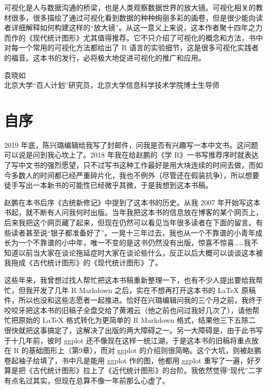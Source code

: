 \documentclass[
  b5paper,
  UTF8,twoside]{book}
\begin{document}
可视化是人与数据沟通的桥梁，也是人类观察数据世界的放大镜。可视化相关的教材很多，很多描绘了通过可视化看到数据的种种绚丽多彩的画卷，但是很少能向读者详细解释如何构建这样的``放大镜''。从这一意义上来说，这本作者聚十四年之力而作的《现代统计图形》尤其值得推荐。它不只介绍了可视化的概念和方法，书中对每一个常用的可视化方法都给出了 R 语言的实验细节，这是很多可视化实践者的福音。这本书的发行，必将极大地促进可视化的推广和应用。

\begin{flushright}
袁晓如\\
北京大学``百人计划''研究员，北京大学信息科学技术学院博士生导师
\end{flushright}

\chapter*{自序}\label{preface}

2019 年底，陈兴璐编辑给我写了封邮件，问我是否有兴趣写一本中文书。这问题可以说是问到我心坎上了。2018 年我在给赵鹏的《学 R》一书写推荐序时就表达了写中文书的强烈愿望，只不过写书这种工作最好是用大块连续的时间去做，而如今多数人的时间都已经严重碎片化，我也不例外（尽管还在假装抗争），所以想要徒手写出一本新书的可能性已经微乎其微，于是我想到这本书稿。

赵鹏在本书后序《古统新修记》中提到了这本书的历史。从我 2007 年开始写这本书起，就不断有人问我何时出版。当年我把这本书的信息放在博客的某个网页上，后来我把这个网页藏了起来，但现在仍然可以看见当年很多读者在下面的留言。有些读者甚至说``银子都准备好了''。一晃十三年过去，我也从一个不靠谱的小青年成长为一个不靠谱的小中年，唯一不变的是这书仍然没有出版，惊喜不惊喜\ldots\ldots 我不知道以前当大家在谈论拖延症时大家在谈论些什么，反正以后大概可以谈谈这本被我拖成《古代统计图形》的《现代统计图形》了。

这些年来，我曾想过找人帮忙把这本书稿重新整理一下，也有不少人提出要给我帮忙，但我开发了几年 R Markdown 之后，实在不想再打开这本书的 LaTeX 原稿件，所以也没和这些志愿者一起推进。恰好在兴璐编辑问我的三个月之前，我终于咬咬牙把这本书的旧稿子全盘交给了黄湘云（他之前也问过我好几次了），请他帮忙把原始的 LaTeX 格式转化为更简单的 R Markdown 格式，结果他三下五除二很快就把这事搞定了，这解决了出版的两大障碍之一。另一大障碍是，由于此书写于十几年前，彼时 ggplot 还不像现在这样一统江湖，于是这本书的旧稿将重点放在 R 的基础图形上（第9章），而对 ggplot 的介绍则很简略。这个大坑，则被赵鹏卷起袖子给填了，书中凡是能用 ggplot 作的图，他都用 ggplot 重写了一遍，好歹算是把《古代统计图形》拉上了《近代统计图形》的台阶。我依然觉得``现代''二字有点名过其实，但现在总算不像一年前那么心虚了。
\end{document}

